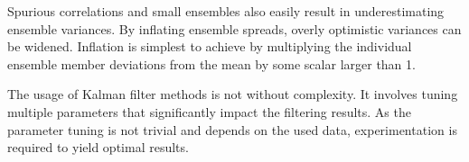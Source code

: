 Spurious correlations and small ensembles also easily result in underestimating ensemble variances.
By inflating ensemble spreads, overly optimistic variances can be widened.
Inflation is simplest to achieve by multiplying the individual ensemble member deviations from the mean by some scalar larger than 1.

The usage of Kalman filter methods is not without complexity.
It involves tuning multiple parameters that significantly impact the filtering results.
As the parameter tuning is not trivial and depends on the used data, experimentation is required to yield optimal results.
